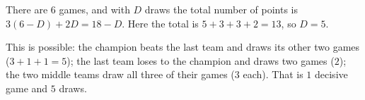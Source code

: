 There are $6$ games, and with $D$ draws the total number of points is $3(6-D)+2D=18-D$. Here the total is $5+3+3+2=13$, so $D=\boxed{5}$.

This is possible: the champion beats the last team and draws its other two games ($3+1+1=5$); the last team loses to the champion and draws two games ($2$); the two middle teams draw all three of their games ($3$ each). That is $1$ decisive game and $5$ draws.
